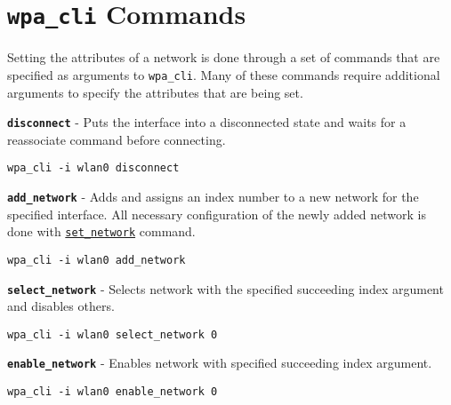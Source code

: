 %
%
\section{\texttt{wpa\_cli} Commands}
Setting the attributes of a network is done through a set of commands that are specified as arguments to \Verb|wpa_cli|. Many of these commands require additional arguments to specify the attributes that are being set. \\



\noindent
{} \texttt{\bfseries disconnect} - Puts the interface into a disconnected state and waits for a reassociate command before connecting.

	\begin{lstlisting}[style=framelesstext]
	wpa_cli -i wlan0 disconnect
	\end{lstlisting}


\noindent
{} \texttt{\bfseries add\_network} - Adds and assigns an index number to a new network for the specified interface. All necessary configuration of the newly added network is done with \hyperref[sub:setnetwork]{\texttt{set\_network}} command.

	\begin{lstlisting}[style=framelesstext]
	wpa_cli -i wlan0 add_network
	\end{lstlisting}



\noindent
{} \texttt{\bfseries select\_network} - Selects network with the specified succeeding index argument and disables others.

	\begin{lstlisting}[style=framelesstext]
	wpa_cli -i wlan0 select_network 0
	\end{lstlisting}


\noindent
{} \texttt{\bfseries enable\_network} - Enables network with specified succeeding index argument.

	\begin{lstlisting}[style=framelesstext]
	wpa_cli -i wlan0 enable_network 0
	\end{lstlisting}


